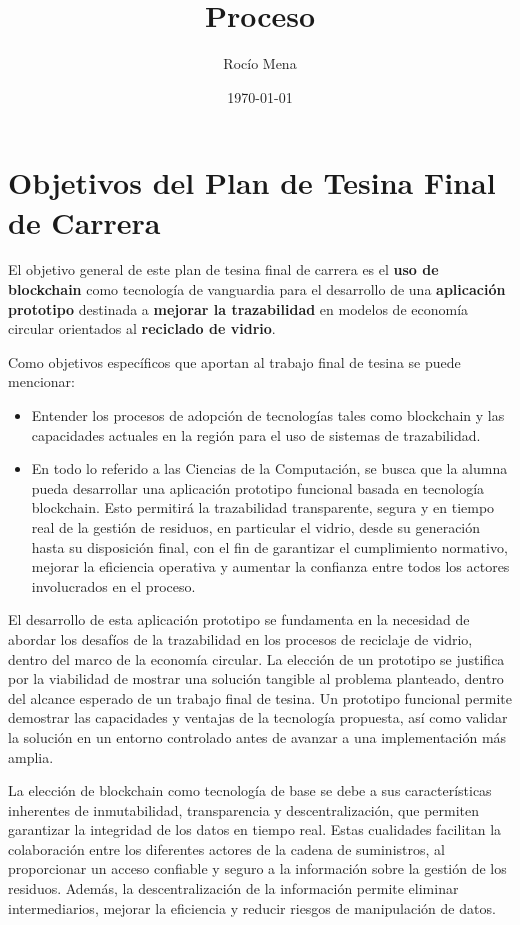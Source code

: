 \documentclass[main.tex]{subfiles}
\title{Proceso}
\author{Rocío Mena}
\date{\today}
\begin{document}
\maketitle

\section{Objetivos del Plan de Tesina Final de Carrera}

El objetivo general de este plan de tesina final de carrera es el \textbf{uso de blockchain} como tecnología de vanguardia para el desarrollo de una \textbf{aplicación prototipo} destinada a \textbf{mejorar la trazabilidad} en modelos de economía circular orientados al \textbf{reciclado de vidrio}.

Como objetivos específicos que aportan al trabajo final de tesina se puede mencionar:

\begin{itemize}
    \item Entender los procesos de adopción de tecnologías tales como blockchain y las capacidades actuales en la región para el uso de sistemas de trazabilidad.
    \item En todo lo referido a las Ciencias de la Computación, se busca que la alumna pueda desarrollar una aplicación prototipo funcional basada en tecnología blockchain. Esto permitirá la trazabilidad transparente, segura y en tiempo real de la gestión de residuos, en particular el vidrio, desde su generación hasta su disposición final, con el fin de garantizar el cumplimiento normativo, mejorar la eficiencia operativa y aumentar la confianza entre todos los actores involucrados en el proceso.
\end{itemize}

El desarrollo de esta aplicación prototipo se fundamenta en la necesidad de abordar los desafíos de la trazabilidad en los procesos de reciclaje de vidrio, dentro del marco de la economía circular. La elección de un prototipo se justifica por la viabilidad de mostrar una solución tangible al problema planteado, dentro del alcance esperado de un trabajo final de tesina. Un prototipo funcional permite demostrar las capacidades y ventajas de la tecnología propuesta, así como validar la solución en un entorno controlado antes de avanzar a una implementación más amplia.

La elección de blockchain como tecnología de base se debe a sus características inherentes de inmutabilidad, transparencia y descentralización, que permiten garantizar la integridad de los datos en tiempo real. Estas cualidades facilitan la colaboración entre los diferentes actores de la cadena de suministros, al proporcionar un acceso confiable y seguro a la información sobre la gestión de los residuos. Además, la descentralización de la información permite eliminar intermediarios, mejorar la eficiencia y reducir riesgos de manipulación de datos.
\end{document}
